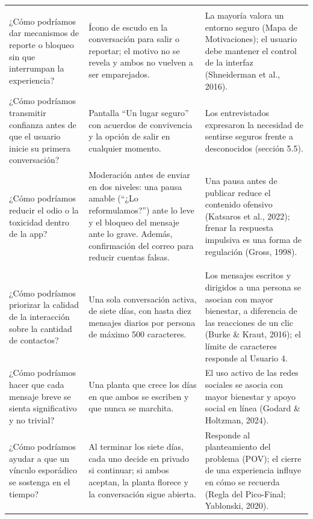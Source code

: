 \begin{longtable}{
  >{\raggedright\arraybackslash}p{}
  >{\raggedright\arraybackslash}p{}
  >{\raggedright\arraybackslash}p{}
}
\addlinespace[4pt]
\multicolumn{3}{l}{\textbf{Conocimiento: Temor a la hostilidad o a desconocidos con malas intenciones}} \\[4pt]
¿Cómo podríamos dar mecanismos de reporte o bloqueo sin que interrumpan la experiencia?
&
Ícono de escudo en la conversación para salir o reportar; el motivo no se revela y ambos no vuelven a ser emparejados.
&
La mayoría valora un entorno seguro (Mapa de Motivaciones); el usuario debe mantener el control de la interfaz (Shneiderman et al., 2016). \\[6pt]

¿Cómo podríamos transmitir confianza antes de que el usuario inicie su primera conversación?
&
Pantalla ``Un lugar seguro'' con acuerdos de convivencia y la opción de salir en cualquier momento.
&
Los entrevistados expresaron la necesidad de sentirse seguros frente a desconocidos (sección 5.5). \\[6pt]

¿Cómo podríamos reducir el odio o la toxicidad dentro de la app?
&
Moderación antes de enviar en dos niveles: una pausa amable (``¿Lo reformulamos?'') ante lo leve y el bloqueo del mensaje ante lo grave. Además, confirmación del correo para reducir cuentas falsas.
&
Una pausa antes de publicar reduce el contenido ofensivo (Katsaros et al., 2022); frenar la respuesta impulsiva es una forma de regulación (Gross, 1998). \\[6pt]

\addlinespace[4pt]
\multicolumn{3}{l}{\textbf{Conocimiento: Pocos vínculos, pero significativos}} \\[4pt]
¿Cómo podríamos priorizar la calidad de la interacción sobre la cantidad de contactos?
&
Una sola conversación activa, de siete días, con hasta diez mensajes diarios por persona de máximo 500 caracteres.
&
Los mensajes escritos y dirigidos a una persona se asocian con mayor bienestar, a diferencia de las reacciones de un clic (Burke \& Kraut, 2016); el límite de caracteres responde al Usuario 4. \\[6pt]

¿Cómo podríamos hacer que cada mensaje breve se sienta significativo y no trivial?
&
Una planta que crece los días en que ambos se escriben y que nunca se marchita.
&
El uso activo de las redes sociales se asocia con mayor bienestar y apoyo social en línea (Godard \& Holtzman, 2024). \\[6pt]

¿Cómo podríamos ayudar a que un vínculo esporádico se sostenga en el tiempo?
&
Al terminar los siete días, cada uno decide en privado si continuar; si ambos aceptan, la planta florece y la conversación sigue abierta.
&
Responde al planteamiento del problema (POV); el cierre de una experiencia influye en cómo se recuerda (Regla del Pico-Final; Yablonski, 2020). \\[6pt]


\end{longtable}

